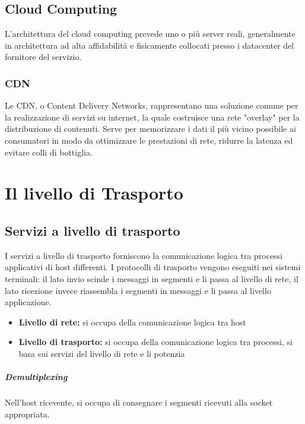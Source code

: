 \documentclass{report}
\begin{document}
	\section{Cloud Computing}
	L'architettura del cloud computing prevede uno o più server reali, generalmente in architettura ad alta affidabilità e fisicamente collocati presso i datacenter del fornitore del servizio.
	\subsection{CDN}
	Le CDN, o Content Delivery Networks, rappresentano una soluzione comune per la realizzazione di servizi su internet, la quale costruisce una rete "overlay" per la distribuzione di contenuti. Serve per memorizzare i dati il più vicino possibile ai consumatori in modo da ottimizzare le prestazioni di rete, ridurre la latenza ed evitare colli di bottiglia.
	\chapter{Il livello di Trasporto}
	\section{Servizi a livello di trasporto}
	I servizi a livello di trasporto forniscono la comunicazione logica tra processi applicativi di host differenti. I protocolli di trasporto vengono eseguiti nei sistemi terminali: il lato invio scinde i messaggi in segmenti e li passa al livello di rete, il lato ricezione invece riassembla i segmenti in messaggi e li passa al livello applicazione.
	\begin{itemize}
		\item \textbf{Livello di rete:} si occupa della comunicazione logica tra host
		\item \textbf{Livello di trasporto:} si occupa della comunicazione logica tra processi, si basa sui servizi del livello di rete e li potenzia
	\end{itemize}
	\paragraph{Demultiplexing} Nell'host ricevente, si occupa di consegnare i segmenti ricevuti alla socket appropriata.
\end{document}
